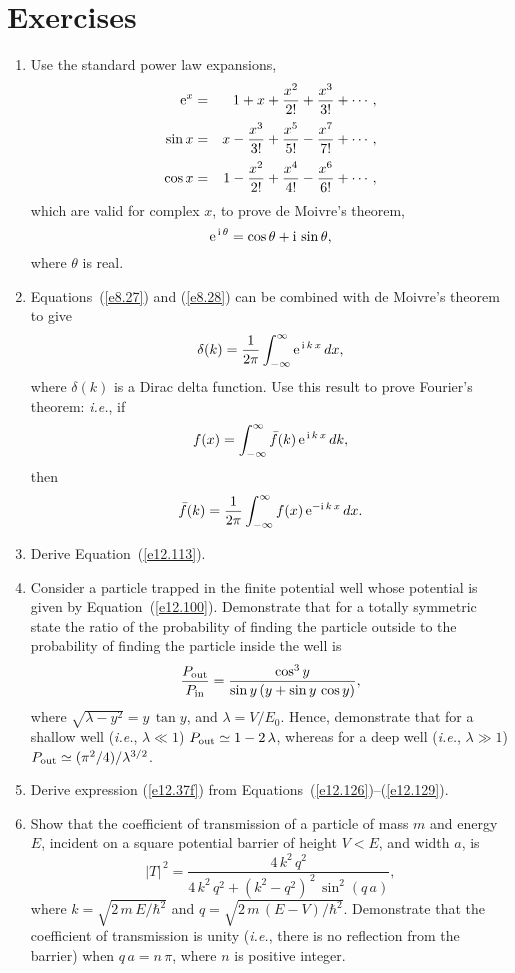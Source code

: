 \section{Exercises}
{\small
\begin{enumerate}
\item Use the standard power law expansions, 
\begin{eqnarray}
{\rm e}^x &=& 1 + x + \frac{x^2}{2!} + \frac{x^3}{3!}+\cdots,\nonumber\\[0.5ex]
\sin x &=& x - \frac{x^3}{3!} + \frac{x^5}{5!}-\frac{x^7}{7!}+\cdots,\nonumber\\[0.5ex]
\cos x &=&1-\frac{x^2}{2!} + \frac{x^4}{4!}-\frac{x^6}{6!}+\cdots,\nonumber
\end{eqnarray}
which are valid for complex $x$, 
to prove de Moivre's theorem,
$$
{\rm e}^{\,{\rm i}\,\theta} = \cos\theta + {\rm i}\,\sin\theta,
$$
where $\theta$ is real.
\item Equations~(\ref{e8.27}) and (\ref{e8.28}) can be combined with de Moivre's theorem to give
$$
\delta(k) = \frac{1}{2\pi}\int_{-\infty}^\infty {\rm e}^{\,{\rm i}\,k\,x}\,dx,
$$
where $\delta(k)$ is a Dirac delta function. 
Use this result to prove Fourier's theorem: {\em i.e.}, if
$$
f(x) = \int_{-\infty}^{\infty} \bar{f}(k)\,{\rm e}^{\,{\rm i}\,k\,x}\,dk,
$$
then
$$
\bar{f}(k) = \frac{1}{2\pi}\int_{-\infty}^\infty f(x)\,{\rm e}^{-{\rm i}\,k\,x}\,dx.
$$

\item Derive Equation~(\ref{e12.113}).

\item Consider a particle trapped in the finite potential well whose potential is given by Equation~(\ref{e12.100}). 
Demonstrate that for a totally symmetric state the ratio of the probability  of finding the particle outside to the
probability of finding the particle inside the well is
$$
\frac{P_{\rm out}}{P_{\rm in}}= \frac{\cos^3 y}{\sin y\,(y + \sin y\,\cos y)},
$$
where 
$\sqrt{\lambda-y^2} = y\,\tan y$, and 
$\lambda = V/E_0$. Hence, demonstrate that for a shallow well ({\em i.e.}, $\lambda\ll 1$) $P_{\rm out}\simeq 1 - 2\,\lambda$, 
whereas for a deep well ({\em i.e.}, $\lambda\gg 1$) $P_{\rm out}\simeq (\pi^2/4) / \lambda^{3/2}$.

\item Derive expression (\ref{e12.37f}) from Equations~(\ref{e12.126})--(\ref{e12.129}).

\item Show that the coefficient of transmission of a particle of mass $m$ and energy $E$, incident on a square
potential barrier of height $V<E$, and  width $a$, is
$$
|T|^{\,2} = \frac{4\,k^2\,q^2}{4\,k^2\,q^2 + (k^2-q^2)^{\,2}\,\sin^2(q\,a)},
$$
where $k=\sqrt{2\,m\,E/\hbar^2}$ and $q=\sqrt{2\,m\,(E-V)/\hbar^2}$. Demonstrate that the coefficient of transmission
is unity ({\em i.e.}, there is no reflection from the barrier) when $q\,a=n\,\pi$, where $n$ is positive
integer. 


\end{enumerate}}
